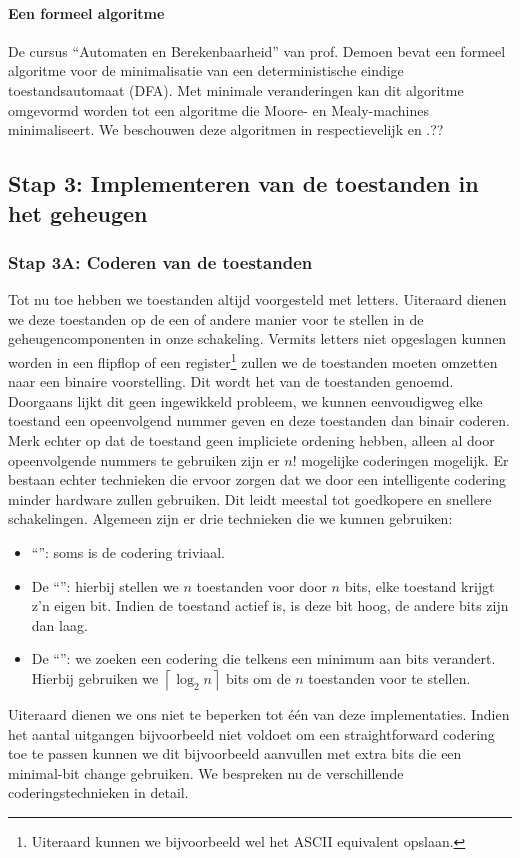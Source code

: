 \paragraph{Een formeel algoritme}
De cursus ``Automaten en Berekenbaarheid'' van prof. Demoen\cite{aenb10} bevat een formeel algoritme voor de minimalisatie van een deterministische eindige toestandsautomaat (DFA). Met minimale veranderingen kan dit algoritme omgevormd worden tot een algoritme die Moore- en Mealy-machines minimaliseert. We beschouwen deze algoritmen in respectievelijk  en .??%
\subsection{Stap 3: Implementeren van de toestanden in het geheugen}
\subsubsection{Stap 3A: Coderen van de toestanden}
Tot nu toe hebben we toestanden altijd voorgesteld met letters. Uiteraard dienen we deze toestanden op de een of andere manier voor te stellen in de geheugencomponenten in onze schakeling. Vermits letters niet opgeslagen kunnen worden in een flipflop of een register\footnote{Uiteraard kunnen we bijvoorbeeld wel het ASCII equivalent opslaan.} zullen we de toestanden moeten omzetten naar een binaire voorstelling. Dit wordt het  van de toestanden genoemd. Doorgaans lijkt dit geen ingewikkeld probleem, we kunnen eenvoudigweg elke toestand een opeenvolgend nummer geven en deze toestanden dan binair coderen. Merk echter op dat de toestand geen impliciete ordening hebben, alleen al door opeenvolgende nummers te gebruiken zijn er $n!$ mogelijke coderingen mogelijk. Er bestaan echter technieken die ervoor zorgen dat we door een intelligente codering minder hardware zullen gebruiken. Dit leidt meestal tot goedkopere en snellere schakelingen. Algemeen zijn er drie technieken die we kunnen gebruiken:
\begin{itemize}
 \item ``'': soms is de codering triviaal.
 \item De ``'': hierbij stellen we $n$ toestanden voor door $n$ bits, elke toestand krijgt z'n eigen bit. Indien de toestand actief is, is deze bit hoog, de andere bits zijn dan laag.
 \item De ``'': we zoeken een codering die telkens een minimum aan bits verandert. Hierbij gebruiken we $\left\lceil\log_2 n\right\rceil$ bits om de $n$ toestanden voor te stellen.
\end{itemize}
Uiteraard dienen we ons niet te beperken tot \'e\'en van deze implementaties. Indien het aantal uitgangen bijvoorbeeld niet voldoet om een straightforward codering toe te passen kunnen we dit bijvoorbeeld aanvullen met extra bits die een minimal-bit change gebruiken. We bespreken nu de verschillende coderingstechnieken in detail.
